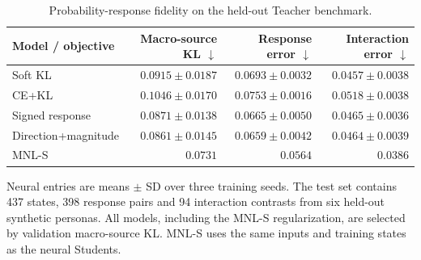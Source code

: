 \begin{table}[pos=htbp]\centering\small
\centering\small
\caption{Probability-response fidelity on the held-out Teacher benchmark.}
\label{tab:response_main}
\setlength{\tabcolsep}{4pt}
\renewcommand{\arraystretch}{1.12}
\begin{tabular*}{\linewidth}{@{\extracolsep{\fill}}lrrr@{}}
\toprule
Model / objective & Macro-source KL $\downarrow$ & Response error $\downarrow$ & Interaction error $\downarrow$ \\
\midrule
Soft KL & $0.0915\pm0.0187$ & $0.0693\pm0.0032$ & $0.0457\pm0.0038$ \\
CE+KL & $0.1046\pm0.0170$ & $0.0753\pm0.0016$ & $0.0518\pm0.0038$ \\
Signed response & $0.0871\pm0.0138$ & $0.0665\pm0.0050$ & $0.0465\pm0.0036$ \\
Direction+magnitude & $0.0861\pm0.0145$ & $0.0659\pm0.0042$ & $0.0464\pm0.0039$ \\
\midrule
MNL-S & $0.0731$ & $0.0564$ & $0.0386$ \\
\bottomrule
\end{tabular*}
\par\smallskip\begin{minipage}{\linewidth}\footnotesize
Neural entries are means $\pm$ SD over three training seeds. The test set contains 437 states, 398 response pairs and 94 interaction contrasts from six held-out synthetic personas. All models, including the MNL-S regularization, are selected by validation macro-source KL. MNL-S uses the same inputs and training states as the neural Students.
\end{minipage}
\end{table}
